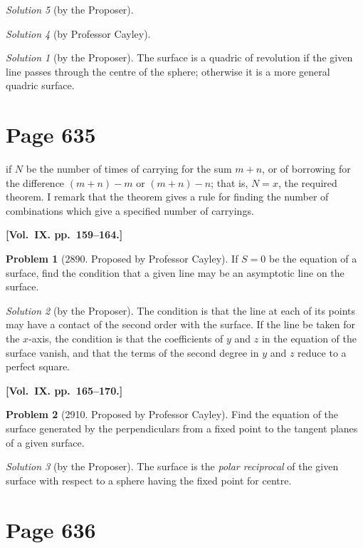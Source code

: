 \documentclass[12pt,a4paper]{article}
\theoremstyle{plain}
\theoremstyle{definition}
\newtheorem{problem}{Problem}
\theoremstyle{remark}
\newtheorem*{solution}{Solution}
\begin{document}
\begin{solution}[by the Proposer]
\begin{solution}[by Professor Cayley]
\begin{solution}[by the Proposer]
The surface is a quadric of revolution if the given line passes through the centre of the sphere; otherwise it is a more general quadric surface.
\end{solution}

\section*{Page 635}
\setcounter{page}{635}

if $N$ be the number of times of carrying for the sum $m + n$, or of borrowing for the difference $(m + n) - m$ or $(m + n) - n$; that is, $N = x$, the required theorem. I remark that the theorem gives a rule for finding the number of combinations which give a specified number of carryings.

\medskip\noindent\textbf{[Vol.~IX. pp.~159--164.]}

\begin{problem}[2890. Proposed by Professor Cayley]
If $S = 0$ be the equation of a surface, find the condition that a given line may be an asymptotic line on the surface.
\end{problem}

\begin{solution}[by the Proposer]
The condition is that the line at each of its points may have a contact of the second order with the surface. If the line be taken for the $x$-axis, the condition is that the coefficients of $y$ and $z$ in the equation of the surface vanish, and that the terms of the second degree in $y$ and $z$ reduce to a perfect square.
\end{solution}

\medskip\noindent\textbf{[Vol.~IX. pp.~165--170.]}

\begin{problem}[2910. Proposed by Professor Cayley]
Find the equation of the surface generated by the perpendiculars from a fixed point to the tangent planes of a given surface.
\end{problem}

\begin{solution}[by the Proposer]
The surface is the \textit{polar reciprocal} of the given surface with respect to a sphere having the fixed point for centre.
\end{solution}

\section*{Page 636}
\setcounter{page}{636}


\end{solution}
\end{solution}
\end{document}
